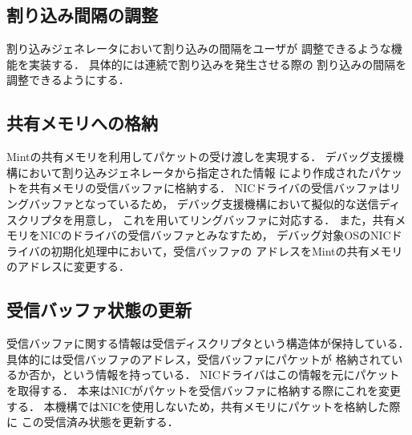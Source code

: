 \documentclass[tanilab-enum]{graduate}
\begin{document}
\subsection{割り込み間隔の調整}
割り込みジェネレータにおいて割り込みの間隔をユーザが
調整できるような機能を実装する．
具体的には連続で割り込みを発生させる際の
割り込みの間隔を調整できるようにする．

\subsection{共有メモリへの格納}
Mintの共有メモリを利用してパケットの受け渡しを実現する．
デバッグ支援機構において割り込みジェネレータから指定された情報
により作成されたパケットを共有メモリの受信バッファに格納する．
NICドライバの受信バッファはリングバッファとなっているため，
デバッグ支援機構において擬似的な送信ディスクリプタを用意し，
これを用いてリングバッファに対応する．
また，共有メモリをNICのドライバの受信バッファとみなすため，
デバッグ対象OSのNICドライバの初期化処理中において，受信バッファの
アドレスをMintの共有メモリのアドレスに変更する．
\subsection{受信バッファ状態の更新}
受信バッファに関する情報は受信ディスクリプタという構造体が保持している．
具体的には受信バッファのアドレス，受信バッファにパケットが
格納されているか否か，という情報を持っている．
NICドライバはこの情報を元にパケットを取得する．
本来はNICがパケットを受信バッファに格納する際にこれを変更する．
本機構ではNICを使用しないため，共有メモリにパケットを格納した際に
この受信済み状態を更新する．
\end{document}
